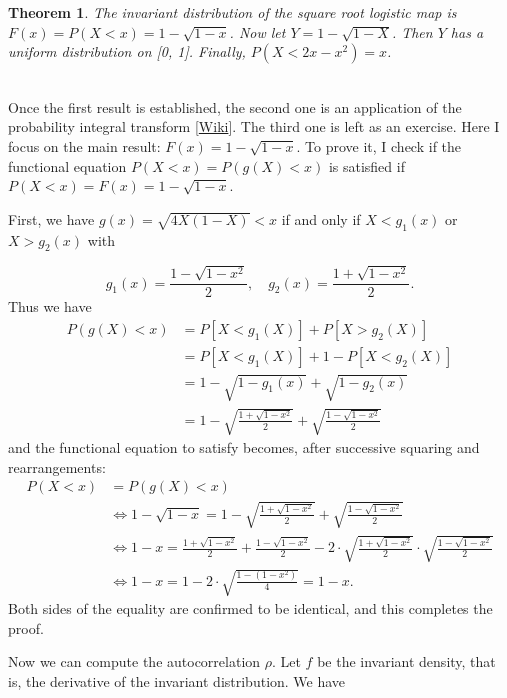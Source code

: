 \documentclass[oneside,10pt]{book}
\newtheorem{theorem}{Theorem}[section]
\newenvironment{proof}[1][Proof]{\begin{trivlist}
\item[\hskip \labelsep {\bfseries #1}]}{\end{trivlist}}
\newcommand{\qed}{\nobreak \ifvmode \relax \else
      \ifdim\lastskip<1.5em \hskip-\lastskip
      \hskip1.5em plus0em minus0.5em \fi \nobreak
      \vrule height0.75em width0.5em depth0.25em\fi}
\begin{document}
\begin{theorem}\label{thm87h}
The invariant distribution of
 the square root logistic map  is $F(x)=P(X < x) = 1 - \sqrt{1 - x}$. Now let $Y = 1 - \sqrt{1 - X}$. Then $Y$ has a uniform distribution on [0, 1]. Finally, $P(X < 2x - x^2) = x$.
\end{theorem}
\begin{proof} 
\quad \\
Once the first result is established, the second one is an application of the 
\textcolor{index}{probability integral transform}
 [\href{https://en.wikipedia.org/wiki/Probability_integral_transform}{Wiki}]. The third one is left as an exercise. Here I focus on the 
 main result: $F(x)=1 - \sqrt{1 - x}$.  To prove it, I check if the 
 \textcolor{index}{functional equation} $P(X<x) = P(g(X)<x)$ is satisfied if $P(X<x)=F(x)=1 - \sqrt{1 - x}$.

\noindent First, we have $g(x)=\sqrt{4X(1-X)}<x$  if and only if $X< g_1(x)$ or $X>g_2(x)$ with 

$$g_1(x) = \frac{1-\sqrt{1-x^2}}{2}, \quad g_2(x) = \frac{1+\sqrt{1-x^2}}{2}.$$
Thus we have
\begin{align}
P(g(X)<x) & = P[X<g_1(X)] + P[X>g_2(X)] \nonumber \\
  & = P[X<g_1(X)] + 1 - P[X<g_2(X)] \nonumber \\
 & = 1 - \sqrt{1-g_1(x)} + \sqrt{1-g_2(x)} \nonumber \\
 & = 1 - \sqrt{\frac{1+\sqrt{1-x^2}}{2}} + \sqrt{\frac{1-\sqrt{1-x^2}}{2}} \nonumber
\end{align}
and the functional equation to satisfy becomes, after successive squaring and rearrangements:
\begin{align}
P(X<x) & = P(g(X)<x) \nonumber \\
 & \Leftrightarrow 1-\sqrt{1-x} = 1 - \sqrt{\frac{1+\sqrt{1-x^2}}{2}} + \sqrt{\frac{1-\sqrt{1-x^2}}{2}} \nonumber \\
 & \Leftrightarrow 1-x = \frac{1+\sqrt{1-x^2}}{2} + \frac{1-\sqrt{1-x^2}}{2}
 -2 \cdot \sqrt{\frac{1+\sqrt{1-x^2}}{2}} \cdot \sqrt{\frac{1-\sqrt{1-x^2}}{2}} \nonumber \\
& \Leftrightarrow 1-x = 1 - 2\cdot\sqrt{\frac{1-(1-x^2)}{4}} = 1-x.\nonumber
\end{align}
Both sides of the equality are confirmed to be identical, and this completes the proof. \qed
\end{proof}
Now we can compute the autocorrelation $\rho$. Let $f$ be the invariant density, that is, the derivative of the invariant distribution. We have
\end{document}
